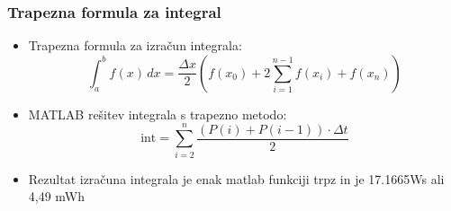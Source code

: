 \documentclass{beamer}
\begin{document}
\begin{frame}
  \frametitle{Trapezna formula za integral}
  \begin{itemize}
    \item Trapezna formula za izračun integrala:
    \[
    \int_a^b f(x) \, dx = \frac{\Delta x}{2} \left( f(x_0) + 2 \sum_{i=1}^{n-1} f(x_i) + f(x_n) \right)
    \]
    \item MATLAB rešitev integrala s trapezno metodo:
    \[
     \text{int} =\sum_{i=2}^{n} \frac{(P(i) + P(i-1)) \cdot \Delta t}{2}
    \]
    \item Rezultat izračuna integrala je enak matlab funkciji trpz in je 17.1665Ws ali 4,49 mWh   
  \end{itemize}
\end{frame}
\end{document}
